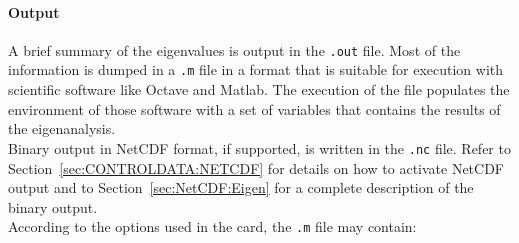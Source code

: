 \paragraph{Output}
A brief summary of the eigenvalues is output in the \texttt{.out} file.
Most of the information is dumped in a \texttt{.m} file in a format
that is suitable for execution with scientific software like
Octave and Matlab. The execution of the file populates the environment 
of those software with a set of variables that contains the results 
of the eigenanalysis. \\ 
Binary output in NetCDF format, if supported, is written in the 
\texttt{.nc} file. Refer to Section~\ref{sec:CONTROLDATA:NETCDF} 
for details on how to activate NetCDF output and to 
Section~\ref{sec:NetCDF:Eigen} for a complete description of the 
binary output. \\
According to the options used in the 
 card,
the \texttt{.m} file may contain:
